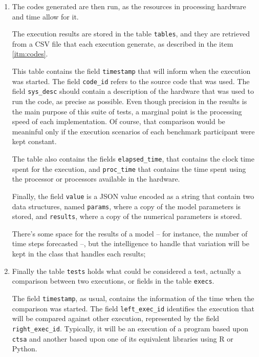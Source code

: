 \documentclass[a4paper,10pt]{article}
\begin{document}
\begin{enumerate}
    \item \label{itm:execs}
        The codes generated are then run, as the resources in
        processing hardware and time allow for it.

        The execution results are stored in the table
        {\tt tables}, and they are retrieved from a CSV file
        that each execution generate, as described in the item
        \ref{itm:codes}.

        This table contains the field {\tt timestamp} that will
        inform when the execution was started. The field
        {\tt code\_id} refers to the source code that was used.
        The field {\tt sys\_desc} should contain a description
        of the hardware that was used to run the code, as precise
        as possible. Even though precision in the results is the
        main purpose of this suite of tests, a marginal point is
        the processing speed of each implementation. Of course,
        that comparison would be meaninful only if the execution
        scenarios of each benchmark participant were kept
        constant.

        The table also contains the fields {\tt elapsed\_time},
        that contains the clock time spent for the execution, and
        {\tt proc\_time} that contains the time spent using the
        processor or processors available in the hardware.

        Finally, the field {\tt value} is a JSON value encoded as
        a string that contain two data structures, named
        {\tt params}, where a copy of the model parameters is
        stored, and {\tt results}, where a copy of the numerical
        parameters is stored.

        There's some space for the results of a model -- for
        instance, the number of time steps forecasted --, but
        the intelligence to handle that variation will be kept in
        the class that handles each results;

    \item \label{itm:tests}
        Finally the table {\tt tests} holds what could be
        considered a test, actually a comparison between two
        executions, or fields in the table {\tt execs}.

        The field {\tt timestamp}, as usual, contains the
        information of the time when the comparison was started.
        The field {\tt left\_exec\_id} identifies the execution
        that will be compared against other execution, represented
        by the field {\tt right\_exec\_id}. Typically, it will be
        an execution of a program based upon {\tt ctsa} and
        another based upon one of its equivalent libraries using R
        or Python.


\end{enumerate}
\end{document}
